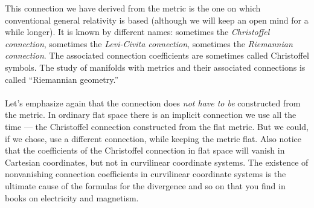 This connection we have derived from the metric is the one on which conventional general
relativity is based (although we will keep an open mind for a while longer). It is known
by different names: sometimes the \emph{Christoffel connection}, sometimes the \emph{Levi-Civita
connection}, sometimes the \emph{Riemannian connection}. The associated
connection coefficients are sometimes called Christoffel symbols. The study of manifolds with
metrics and their associated connections is called “Riemannian geometry.”\\
\\
Let’s emphasize again that the connection does \emph{not have to be} constructed
from the metric. In ordinary flat space there is an implicit connection we use all the time
— the Christoffel connection constructed from the flat metric. But we could, if we chose,
use a different connection, while keeping the metric flat. Also notice that the coefficients
of the Christoffel connection in flat space will vanish in Cartesian coordinates, but not in
curvilinear coordinate systems. The existence of nonvanishing connection coefficients in curvilinear coordinate systems is
the ultimate cause of the formulas for the divergence and so on that you find in books on
electricity and magnetism.

